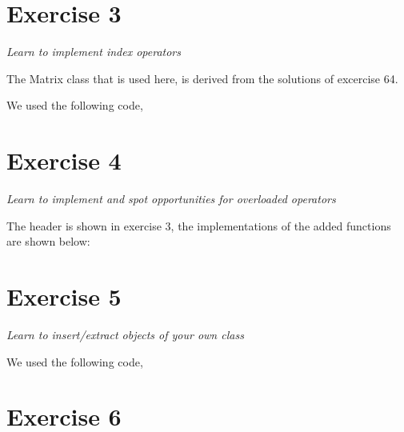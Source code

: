 \documentclass[12pt]{article}
\newcommand{\desc}[1]{\textit{#1} \vspace{1em}}
\begin{document}
\clearpage
\section*{Exercise 3}
\desc{Learn to implement index operators}

The Matrix class that is used here, is derived from the solutions of excercise 64.

We used the following code,


\clearpage
\section*{Exercise 4}
\desc{Learn to implement and spot opportunities for overloaded operators}

The header is shown in exercise 3, the implementations of the added functions are shown below:






\clearpage
\section*{Exercise 5}
\desc{Learn to insert/extract objects of your own class}

We used the following code,








\clearpage
\section*{Exercise 6}
\desc{}
\end{document}
